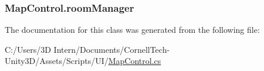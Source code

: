 \subsubsection[{\texorpdfstring{room\+Manager}{roomManager}}]{ Map\+Control.\+room\+Manager}\hypertarget{class_map_control_ab9305dd6451635ad227d129e6f1b21ba}{}\label{class_map_control_ab9305dd6451635ad227d129e6f1b21ba}


The documentation for this class was generated from the following file\+:\begin{DoxyCompactItemize}
\item 
C\+:/\+Users/3\+D Intern/\+Documents/\+Cornell\+Tech-\/\+Unity3\+D/\+Assets/\+Scripts/\+U\+I/\hyperlink{_map_control_8cs}{Map\+Control.\+cs}\end{DoxyCompactItemize}
